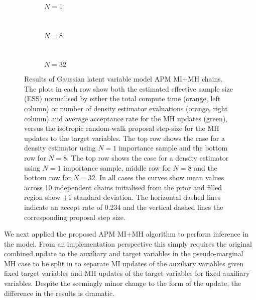 \begin{figure}[t]
\centering
\begin{subfigure}[b]{\linewidth}
\centering
  \caption{$N=1$}
  \label{sfig:apm-mi-mh-1-gaussian-latent}
\end{subfigure}
\\[3mm]
\begin{subfigure}[b]{\linewidth}
\centering
  \caption{$N=8$}
  \label{sfig:apm-mi-mh-8-gaussian-latent}
\end{subfigure}
\\[3mm]
\begin{subfigure}[b]{\linewidth}
\centering
  \caption{$N=32$}
  \label{sfig:apm-mi-mh-32-gaussian-latent}
\end{subfigure}
\caption[\acs{APM} \acs{MI}+\acs{MH} Gaussian model results.]{
Results of Gaussian latent variable model \acs{APM} \acs{MI}+\acs{MH} chains. The plots in each row show both the estimated effective sample size (ESS) normalised by either the total compute time (orange, left column) or number of density estimator evaluations (orange, right column) and average acceptance rate for the \ac{MH} updates (green), versus the isotropic random-walk proposal step-size for the \ac{MH} updates to the target variables. The top row shows the case for a density estimator using $N=1$ importance sample and the bottom row for $N=8$. The top row shows the case for a density estimator using $N=1$ importance sample, middle row for $N=8$ and the bottom row for $N=32$. In all cases the curves show mean values across 10 independent chains initialised from the prior and filled region show $\pm 1$ standard deviation. The horizontal dashed lines indicate an accept rate of 0.234 and the vertical dashed lines the corresponding proposal step size.}
\label{fig:apm-mi-mh-gaussian-latent-results}
\end{figure}

We next applied the proposed \ac{APM} \ac{MI}+\ac{MH} algorithm to perform inference in the model. From an implementation perspective this simply requires the original combined update to the auxiliary and target variables in the pseudo-marginal \ac{MH} case to be split in to separate \ac{MI} updates of the auxiliary variables given fixed target variables and \ac{MH} updates of the target variables for fixed auxiliary variables. Despite the seemingly minor change to the form of the update, the difference in the results is dramatic.

